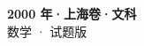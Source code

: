 \documentclass[zihao=-4, a4paper]{ctexart}
\begin{document}
\begin{center}
  {\Large\bfseries 2000 年·上海卷·文科}\\[4pt]
  {\large 数学 · 试题版}
\end{center}
\medskip
{}

\end{document}
